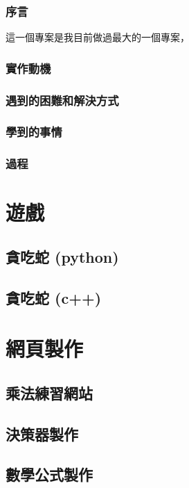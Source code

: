\documentclass[12pt]{ctexart}
\begin{document}
\subsubsection{序言}
這一個專案是我目前做過最大的一個專案，




\subsubsection{ 實作動機 }
\subsubsection{ 遇到的困難和解決方式 }
\subsubsection{ 學到的事情 }
\subsubsection{ 過程 }



\clearpage
\section{ 遊戲}
\label{sec::game}
\subsection{ 貪吃蛇 (python) }
\clearpage
\subsection{ 貪吃蛇 (c++) }

\clearpage
\section{ 網頁製作 }
\label{ sec::website }
\subsection{ 乘法練習網站 }
\clearpage
\subsection{ 決策器製作 }
\clearpage
\subsection{ 數學公式製作 }
\end{document}
